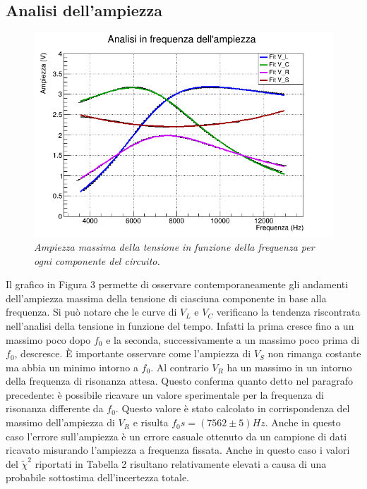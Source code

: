 \documentclass{article}
\begin{document}
\subsection{Analisi dell'ampiezza}
\begin{figure}[h]
  \centering
  \includegraphics[scale=0.45]{AmpFreq.png}
  \caption{\textit{Ampiezza massima della tensione in funzione della frequenza per ogni componente del circuito.}}

\end{figure}
Il grafico in Figura 3 permette di osservare contemporaneamente gli andamenti dell'ampiezza massima della tensione di ciasciuna componente in base alla frequenza. Si può notare che le curve di $V_L$ e $V_C$ verificano la tendenza riscontrata nell'analisi della tensione in funzione del tempo. Infatti la prima cresce fino a un massimo poco dopo $f_0$ e la seconda, successivamente a un massimo poco prima di $f_0$, descresce.
\`E importante osservare come l'ampiezza di $V_S$ non rimanga costante ma abbia un minimo intorno a $f_0$. Al contrario $V_R$ ha un massimo in un intorno della frequenza di risonanza attesa. Questo conferma quanto detto nel paragrafo precedente: è possibile ricavare un valore sperimentale per la frequenza di risonanza differente da $f_0$.
Questo valore è stato calcolato in corrispondenza del massimo dell'ampiezza di $V_R$ e risulta $f_0s=(7562\pm5)Hz$. Anche in questo caso l'errore sull'ampiezza è un errore casuale ottenuto da un campione di dati ricavato misurando l'ampiezza a frequenza fissata. 
Anche in questo caso i valori del $\tilde{\chi}^2$ riportati in Tabella 2 risultano relativamente elevati a causa di una probabile sottostima dell'incertezza totale. 
\end{document}
